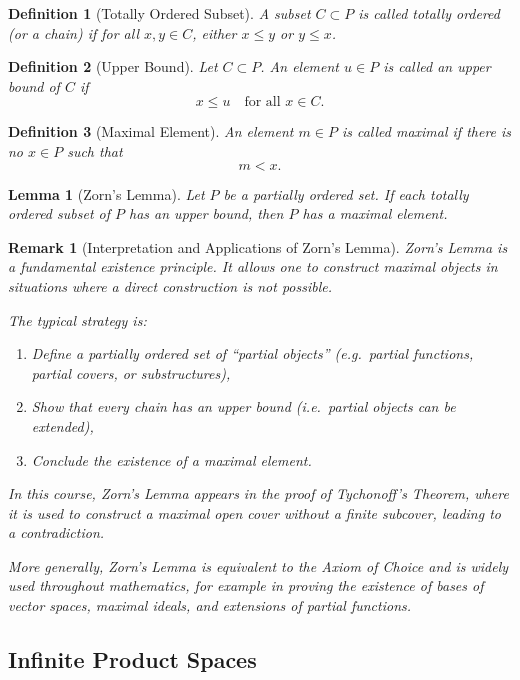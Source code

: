 \documentclass[12pt]{article}
\newtheorem{lemma}{Lemma}
\newtheorem{definition}{Definition}
\newtheorem{remark}{Remark}
\begin{document}
\begin{definition}[Totally Ordered Subset]
A subset $C \subset P$ is called \emph{totally ordered} (or a \emph{chain}) if for all $x,y \in C$, either $x \leq y$ or $y \leq x$.
\end{definition}

\begin{definition}[Upper Bound]
Let $C \subset P$. An element $u \in P$ is called an \emph{upper bound} of $C$ if
\[
x \leq u \quad \text{for all } x \in C.
\]
\end{definition}

\begin{definition}[Maximal Element]
An element $m \in P$ is called \emph{maximal} if there is no $x \in P$ such that
\[
m < x.
\]
\end{definition}

\begin{lemma}[Zorn's Lemma]
Let $P$ be a partially ordered set. If each totally ordered subset of $P$ has an upper bound, then $P$ has a maximal element.
\end{lemma}

\begin{remark}[Interpretation and Applications of Zorn's Lemma]
Zorn's Lemma is a fundamental existence principle. It allows one to construct
\emph{maximal objects} in situations where a direct construction is not possible.

The typical strategy is:
\begin{enumerate}
    \item Define a partially ordered set of ``partial objects'' (e.g.\ partial functions,
    partial covers, or substructures),
    \item Show that every chain has an upper bound (i.e.\ partial objects can be extended),
    \item Conclude the existence of a maximal element.
\end{enumerate}

In this course, Zorn's Lemma appears in the proof of Tychonoff's Theorem,
where it is used to construct a maximal open cover without a finite subcover,
leading to a contradiction.

More generally, Zorn's Lemma is equivalent to the Axiom of Choice and is widely used
throughout mathematics, for example in proving the existence of bases of vector spaces,
maximal ideals, and extensions of partial functions.
\end{remark}

\subsection*{Infinite Product Spaces}
\end{document}
